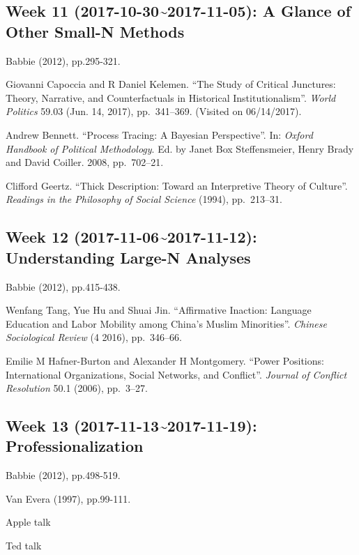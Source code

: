 \documentclass[11pt,]{article}
\begin{document}
\subsection{Week 11 (2017-10-30\textasciitilde{}2017-11-05): A Glance of
Other Small-N
Methods}\label{week-11-2017-10-302017-11-05-a-glance-of-other-small-n-methods}

Babbie (2012), pp.295-321.

Giovanni Capoccia and R Daniel Kelemen. ``The Study of Critical
Junctures: Theory, Narrative, and Counterfactuals in Historical
Institutionalism''. \emph{World Politics} 59.03 (Jun. 14, 2017),
pp.~341--369. (Visited on 06/14/2017).

Andrew Bennett. ``Process Tracing: A Bayesian Perspective''. In:
\emph{Oxford Handbook of Political Methodology}. Ed. by Janet Box
Steffensmeier, Henry Brady and David Coiller. 2008, pp.~702--21.

Clifford Geertz. ``Thick Description: Toward an Interpretive Theory of
Culture''. \emph{Readings in the Philosophy of Social Science} (1994),
pp.~213--31.

\subsection{Week 12 (2017-11-06\textasciitilde{}2017-11-12):
Understanding Large-N
Analyses}\label{week-12-2017-11-062017-11-12-understanding-large-n-analyses}

Babbie (2012), pp.415-438.

Wenfang Tang, Yue Hu and Shuai Jin. ``Affirmative Inaction: Language
Education and Labor Mobility among China's Muslim Minorities''.
\emph{Chinese Sociological Review} (4 2016), pp.~346--66.

Emilie M Hafner-Burton and Alexander H Montgomery. ``Power Positions:
International Organizations, Social Networks, and Conflict''.
\emph{Journal of Conflict Resolution} 50.1 (2006), pp.~3--27.

\subsection{Week 13 (2017-11-13\textasciitilde{}2017-11-19):
Professionalization}\label{week-13-2017-11-132017-11-19-professionalization}

Babbie (2012), pp.498-519.

Van Evera (1997), pp.99-111.

Apple talk

Ted talk
\end{document}
